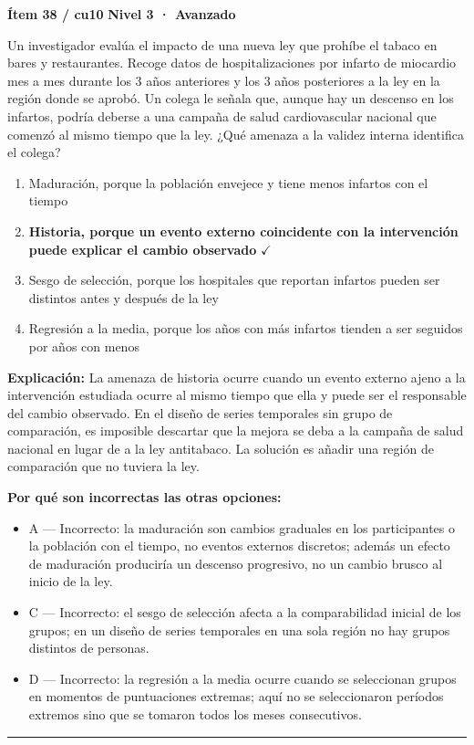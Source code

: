 \documentclass[12pt,a4paper]{article}
\begin{document}
\begin{mdframed}[backgroundcolor=fondogris,linecolor=rojo,linewidth=1pt,innerleftmargin=10pt,innerrightmargin=10pt,innertopmargin=7pt,innerbottommargin=7pt]
\textbf{Ítem 38 / cu10} \hfill {\small\bfseries\color{rojo} Nivel 3 · Avanzado}
\end{mdframed}

Un investigador evalúa el impacto de una nueva ley que prohíbe el tabaco en bares y restaurantes. Recoge datos de hospitalizaciones por infarto de miocardio mes a mes durante los 3 años anteriores y los 3 años posteriores a la ley en la región donde se aprobó. Un colega le señala que, aunque hay un descenso en los infartos, podría deberse a una campaña de salud cardiovascular nacional que comenzó al mismo tiempo que la ley. ¿Qué amenaza a la validez interna identifica el colega?

\begin{enumerate}
  \item[A.] Maduración, porque la población envejece y tiene menos infartos con el tiempo
  \item[\textbf{\color{verde}B.}] \textbf{\color{verde} Historia, porque un evento externo coincidente con la intervención puede explicar el cambio observado} \hfill $\checkmark$
  \item[C.] Sesgo de selección, porque los hospitales que reportan infartos pueden ser distintos antes y después de la ley
  \item[D.] Regresión a la media, porque los años con más infartos tienden a ser seguidos por años con menos
\end{enumerate}

\noindent\textbf{\color{azul}Explicación:} La amenaza de historia ocurre cuando un evento externo ajeno a la intervención estudiada ocurre al mismo tiempo que ella y puede ser el responsable del cambio observado. En el diseño de series temporales sin grupo de comparación, es imposible descartar que la mejora se deba a la campaña de salud nacional en lugar de a la ley antitabaco. La solución es añadir una región de comparación que no tuviera la ley.

\noindent\textbf{\color{gris}Por qué son incorrectas las otras opciones:}
\begin{itemize}
  \item {\small A — Incorrecto: la maduración son cambios graduales en los participantes o la población con el tiempo, no eventos externos discretos; además un efecto de maduración produciría un descenso progresivo, no un cambio brusco al inicio de la ley.}
  \item {\small C — Incorrecto: el sesgo de selección afecta a la comparabilidad inicial de los grupos; en un diseño de series temporales en una sola región no hay grupos distintos de personas.}
  \item {\small D — Incorrecto: la regresión a la media ocurre cuando se seleccionan grupos en momentos de puntuaciones extremas; aquí no se seleccionaron períodos extremos sino que se tomaron todos los meses consecutivos.}
\end{itemize}
\vspace{8pt}\hrule\vspace{10pt}
\end{document}
